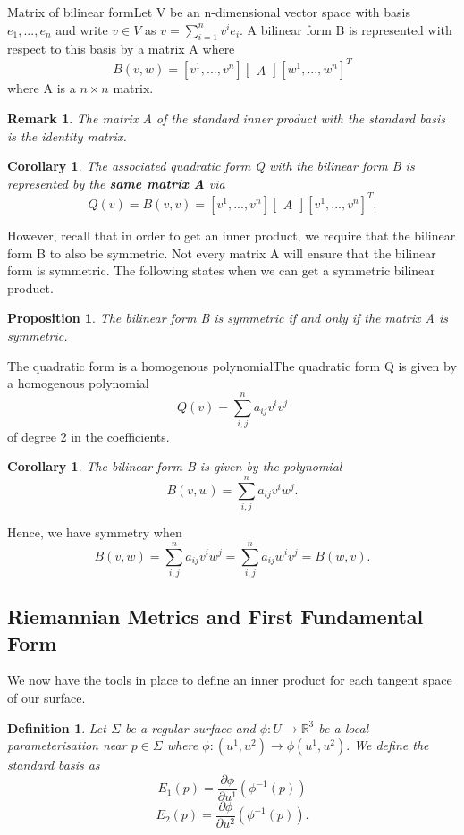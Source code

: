 \documentclass[twoside]{article}
\newtheorem{proposition}[theorem]{Proposition}
\newtheorem{corollary}[theorem]{Corollary}
\newtheorem{definition}[theorem]{Definition}
\newtheorem{remark}[theorem]{Remark}
\begin{document}
\begin{proposition_exam}{Matrix of bilinear form}{}Let V be an n-dimensional vector space with basis $e_1,...,e_n$ and write $v \in V$ as $v = \sum_{i=1}^{n}v^ie_i.$ A bilinear form B is represented with respect to this basis by a matrix A where 
$$
B(v,w) = [v^1,...,v^n]\begin{bmatrix} A
\end{bmatrix}[w^1,...,w^n]^T 
$$
where A is a $n \times n$ matrix.
\end{proposition_exam}

\begin{remark}The matrix A of the standard inner product with the standard basis is the identity matrix.
\end{remark}

\begin{corollary}The associated quadratic form Q with the bilinear form B is represented by the \textbf{same matrix A} via 
$$
Q(v) = B(v,v) = [v^1,...,v^n]\begin{bmatrix} A
\end{bmatrix}[v^1,...,v^n]^T.
$$
\end{corollary}

However, recall that in order to get an inner product, we require that the bilinear form B to also be symmetric. Not every matrix A will ensure that the bilinear form is symmetric. The following states when we can get a symmetric bilinear product.
\begin{proposition}The bilinear form B is symmetric if and only if the matrix A is symmetric.
\end{proposition}

\begin{proposition_exam}{The quadratic form is a homogenous polynomial}{}The quadratic form Q is given by a homogenous polynomial 
$$
Q(v) = \sum_{i,j}^{n}a_{ij}v^iv^j
$$
of degree 2 in the coefficients.
\end{proposition_exam}

\begin{corollary}The bilinear form B is given by the polynomial 
$$
B(v,w) = \sum_{i,j}^{n}a_{ij}v^iw^j.
$$
\end{corollary}

Hence, we have symmetry when 
$$
B(v,w) = \sum_{i,j}^{n}a_{ij}v^iw^j = \sum_{i,j}^{n}a_{ij}w^iv^j = B(w,v).
$$

\subsection{Riemannian Metrics and First Fundamental Form}
We now have the tools in place to define an inner product for each tangent space of our surface.
\begin{definition}Let $\Sigma$ be a regular surface and $\phi: U \rightarrow \mathbb{R}^3$ be a local parameterisation near $p \in \Sigma$ where $\phi: (u^1,u^2) \rightarrow \phi(u^1,u^2).$ We define the standard basis as 
$$
E_1(p) = \frac{\partial \phi}{\partial u^1}(\phi^{-1}(p))
$$
$$
E_2(p) = \frac{\partial \phi}{\partial u^2}(\phi^{-1}(p)).
$$
\end{definition}
\end{document}
